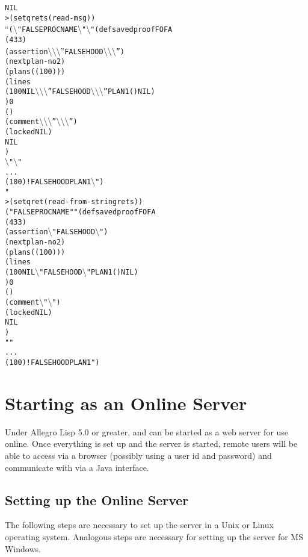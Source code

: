 \begin{alltt}
NIL
> (setq rets (read-msg))
``(\(\setminus\)"FALSEPROCNAME\(\setminus\)" \(\setminus\)"(defsavedproof FOFA
  (4 3 3)
  (assertion \(\setminus\setminus\setminus\)''FALSEHOOD\(\setminus\setminus\setminus\)'')
  (nextplan-no 2)
  (plans ((100)))
  (lines
    (100 NIL \(\setminus\setminus\setminus\)''FALSEHOOD\(\setminus\setminus\setminus\)'' PLAN1 () NIL)
) 0
( )
  (comment \(\setminus\setminus\setminus\)''\(\setminus\setminus\setminus\)'')
  (locked NIL)
  NIL
)
\(\setminus\)" \(\setminus\)"
               ...
(100) !  FALSEHOOD                                            PLAN1\(\setminus\)")
"
> (setq ret (read-from-string rets))
("FALSEPROCNAME" "(defsavedproof FOFA
  (4 3 3)
  (assertion \(\setminus\)"FALSEHOOD\(\setminus\)")
  (nextplan-no 2)
  (plans ((100)))
  (lines
    (100 NIL \(\setminus\)"FALSEHOOD\(\setminus\)" PLAN1 () NIL)
) 0
( )
  (comment \(\setminus\)"\(\setminus\)")
  (locked NIL)
  NIL
)
" "
               ...
(100) !  FALSEHOOD                                            PLAN1")
\end{alltt}

\section{Starting {\TPS} as an Online Server}\label{tps-server}

Under Allegro Lisp 5.0 or greater,
{\TPS}{and {\ETPS}} can be started as a web server for use online.
Once everything is set up and the server is started,
remote users will be able to access {\TPS}
via a browser (possibly using
a user id and password) and communicate with {\TPS} via
a Java interface.

\subsection{Setting up the Online Server}

The following steps are necessary to set up the {\TPS} server
in a Unix or Linux operating system.  Analogous steps
are necessary for setting up the {\TPS} server for MS Windows.

